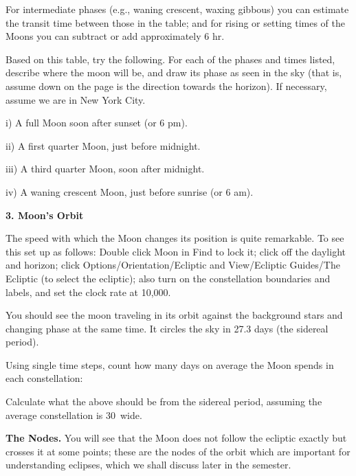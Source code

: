\noindent For intermediate phases (e.g., waning crescent, waxing gibbous) you
can estimate the transit time between those in the table; and for
rising or setting times of the Moons you can subtract or add
approximately 6 hr.

\bigskip
\noindent
Based on this table, try the following. For each of the phases and
times listed, describe where the moon will be, and draw its phase as
seen in the sky (that is, assume down on the page is the direction
towards the horizon). If necessary, assume we are in New York City.

\medskip
i) A full Moon soon after sunset (or 6 pm). 

\centerline{}


ii) A first quarter Moon, just before midnight.

\centerline{}

iii) A third quarter Moon, soon after midnight.

\centerline{}

iv) A waning crescent Moon, just before sunrise (or 6 am).

\centerline{}

\vspace{9cm}

\bigskip
\noindent
{\bf 3. Moon's Orbit}

\medskip\noindent The speed with which the Moon changes its position
is quite remarkable. To see this set up as follows: Double click Moon
in Find to lock it; click off the daylight and horizon; click
Options/Orientation/Ecliptic and View/Ecliptic Guides/The Ecliptic (to
select the ecliptic); also turn on the constellation boundaries and
labels, and set the clock rate at 10,000.

\noindent You should see the moon traveling in its orbit against the background
stars and changing phase at the same time. It circles the sky in 27.3
days (the sidereal period).

\medskip
Using single time steps, count how many days on average the Moon spends in
each constellation:
\makebox[2cm]{\hrulefill}

\medskip
Calculate what the above should be from the sidereal period, assuming
the average constellation is 30\deg\ wide.  \makebox[2cm]{\hrulefill}

\medskip\noindent
{\bf The Nodes.}  You will see that the Moon does not follow the ecliptic exactly but crosses it
at some points; these are the nodes of the orbit which are important
for understanding eclipses, which we shall discuss later in the
semester.

